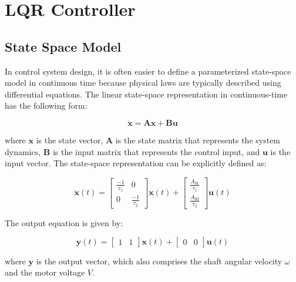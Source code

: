 \chapter{LQR Controller}

\section{State Space Model}
In control system design, it is often easier to define a parameterized state-space model in continuous time because physical laws are typically described using differential equations. The linear state-space representation in continuous-time has the following form:

\begin{equation}
    \dot{\mathbf{x}} = \mathbf{A} \mathbf{x} + \mathbf{B} \mathbf{u}
    \label{eq:state_space_models}
\end{equation}

where \( \mathbf{x} \) is the state vector, \( \mathbf{A} \) is the state matrix that represents the system dynamics, \( \mathbf{B} \) is the input matrix that represents the control input, and \( \mathbf{u} \) is the input vector.
The state-space representation can be explicitly defined as:

\begin{equation}
    \dot{\mathbf{x}}(t) = \begin{bmatrix}
    \frac{-1}{\tau_1} & 0 \\ 
    0 & \frac{-1}{\tau_2}
    \end{bmatrix} \mathbf{x}(t) + \begin{bmatrix} 
    \frac{A_{01}}{\tau_1} \\ 
    \frac{A_{02}}{\tau_2} 
    \end{bmatrix}\mathbf{u}(t)
    \label{eq:state_space_model_cx}
\end{equation}

The output equation is given by:

\begin{equation}
    \mathbf{y}(t) = \begin{bmatrix} 1 & 1 \end{bmatrix}\mathbf{x}(t) + \begin{bmatrix} 0 & 0 \end{bmatrix}\mathbf{u}(t)
    \label{eq:state_space_model_cy}
\end{equation}

where \( \mathbf{y} \) is the output vector, which also comprises the shaft angular velocity \( \omega \) and the motor voltage \( V \).

